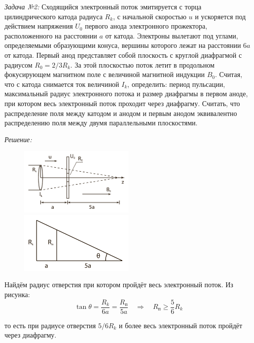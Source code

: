 \emph{Задача №2:} Сходящийся электронный поток эмитируется с торца 
цилиндрического катода радиуса \( R_k \), с начальной скоростью \( u \) и 
ускоряется под действием напряжения \( U_0 \) первого анода электронного 
прожектора, расположенного на расстоянии \( a \) от катода. Электроны вылетают 
под углами, определяемыми образующими конуса, вершины которого лежат на 
расстоянии \( 6a \) от катода. Первый анод представляет собой плоскость с 
круглой диафрагмой с радиусом \( R_0 = 2/3 R_k \). За этой плоскостью поток 
летит в продольном фокусирующем магнитном поле с величиной магнитной индукции 
\( B_0 \). Считая, что с катода снимается ток величиной \( I_k \), определить: 
период пульсации, максимальный радиус электронного потока и размер диафрагмы в 
первом аноде, при котором весь электронный поток проходит через диафрагму. 
Считать, что распределение поля между катодом и анодом и первым анодом 
эквивалентно распределению поля между двумя параллельными плоскостями.

\emph{Решение:}

\begin{figure}
    \vspace{-4ex}
    \includegraphics[width=0.5\textwidth]{images/im_03}
    \includegraphics[width=0.5\textwidth]{images/im_04}
\end{figure}

Найдём радиус отверстия при котором пройдёт весь электронный поток. 
Из рисунка:
\[
	\tan\theta = \frac{R_k}{6a} = \frac{R_\text{п}}{5a} \quad\Rightarrow\quad 
	R_\text{п} \ge \frac{5}{6}R_k
\]

то есть при радиусе отверстия \( 5/6 R_k \) и более весь электронный поток 
пройдёт через диафрагму. 

